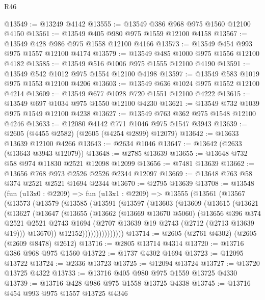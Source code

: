 \begin{lexlean}{R46}
\begin{coremodule}
@13549 := @13249 @4142
@13555 := @13549 @386 @968 @975 @1560 @12100 @4150
@13561 := @13549 @405 @980 @975 @1559 @12100 @4158
@13567 := @13549 @428 @986 @975 @1558 @12100 @4166
@13573 := @13549 @454 @993 @975 @1557 @12100 @4174
@13579 := @13549 @485 @1000 @975 @1556 @12100 @4182
@13585 := @13549 @516 @1006 @975 @1555 @12100 @4190
@13591 := @13549 @542 @1012 @975 @1554 @12100 @4198
@13597 := @13549 @583 @1019 @975 @1553 @12100 @4206
@13603 := @13549 @636 @1024 @975 @1552 @12100 @4214
@13609 := @13549 @677 @1028 @720 @1551 @12100 @4222
@13615 := @13549 @697 @1034 @975 @1550 @12100 @4230
@13621 := @13549 @732 @1039 @975 @1549 @12100 @4238
@13627 := @13549 @763 @362 @975 @1548 @12100 @4246
@13633 := @12080 @4142 @771 @1046 @975 @1547 @3943
@13639 := @2605 (@4455 @2582) (@2605 (@4254 @2899) @12079)
@13642 := @13633 @13639 @12100 @4266
@13643 := @2634 @1046
@13647 := @13642 (@2633 (@13643 @3943 @12079))
@13648 := @2785 @13639
@13655 := @13648 @732 @58 @974 @11830 @2521 @12098 @12099
@13656 := @7481 @13639
@13662 := @13656 @768 @973 @2526 @2526 @2344 @12097
@13669 := @13648 @763 @58 @374 @2521 @2521 @1694 @2344
@13670 := @2795 @13639
@13708 := @13548
    (fun (u13x0 : @2209) =>
    fun (u13x1 : @2209) =>
    @13555
      (@13561
        (@13567
          (@13573
            (@13579
              (@13585
                (@13591
                  (@13597
                    (@13603
                      (@13609
                        (@13615
                          (@13621
                            (@13627
                              (@13647
                                (@13655
                                  (@13662
                                    (@13669 @13670 @5060)
                                    (@13656
                                      @396
                                      @374
                                      @2521
                                      @2521
                                      @2743
                                      @1694
                                      (@2707 @13639 @19 @2743 (@2712 (@2713 @13639 @19)))
                                      @13670))
                                  @12152)))))))))))))))
@13714 := @2605 (@2761 @4302) (@2605 (@2609 @8478) @2612)
@13716 := @2805 @13714 @4314
@13720 := @13716 @386 @968 @975 @1560
@13722 := @1737 @4302 @1694
@13723 := @12095 @13722
@13724 := @2336 @13723
@13725 := @12094 @13724
@13727 := @13720 @13725 @4322
@13733 := @13716 @405 @980 @975 @1559 @13725 @4330
@13739 := @13716 @428 @986 @975 @1558 @13725 @4338
@13745 := @13716 @454 @993 @975 @1557 @13725 @4346

\end{coremodule}
\end{lexlean}
